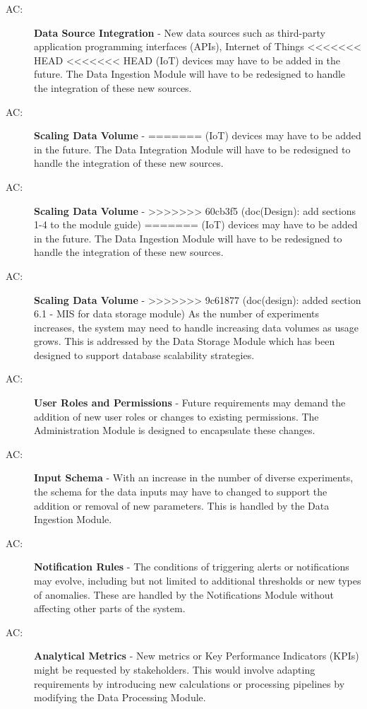 \documentclass[12pt, titlepage]{article}
\newcounter{acnum}
\newcommand{\actheacnum}{AC\theacnum}
\begin{document}
\begin{description}
  \item[ \actheacnum \label{acSource}:] \textbf{Data Source Integration} - 
  New data sources such as third-party application programming interfaces (APIs), Internet of Things
<<<<<<< HEAD
<<<<<<< HEAD
  (IoT) devices may have to be added in the future. The Data Ingestion Module will have to be 
  redesigned to handle the integration of these new sources.

  \item[ \actheacnum \label{acScaling}:] \textbf{Scaling Data Volume} - 
=======
  (IoT) devices may have to be added in the future. The Data Integration Module will have to be 
  redesigned to handle the integration of these new sources.

  \item[ \actheacnum \label{acStorage}:] \textbf{Scaling Data Volume} - 
>>>>>>> 60cb3f5 (doc(Design): add sections 1-4 to the module guide)
=======
  (IoT) devices may have to be added in the future. The Data Ingestion Module will have to be 
  redesigned to handle the integration of these new sources.

  \item[ \actheacnum \label{acScaling}:] \textbf{Scaling Data Volume} - 
>>>>>>> 9c61877 (doc(design): added section 6.1 - MIS for data storage module)
  As the number of experiments increases, the system may need to handle increasing data volumes
  as usage grows. This is addressed by the Data Storage Module which has been designed to support
  database scalability strategies.

  \item[ \actheacnum \label{acRoles}:] \textbf{User Roles and Permissions} - 
  Future requirements may demand the addition of new user roles or changes to existing permissions.
  The Administration Module is designed to encapsulate these changes.

  \item[ \actheacnum \label{acSchema}:] \textbf{Input Schema} - 
  With an increase in the number of diverse experiments, the schema for the data inputs may have to
  changed to support the addition or removal of new parameters. This is handled by the Data Ingestion
  Module.

  \item[ \actheacnum \label{acNotifs}:] \textbf{Notification Rules} - 
  The conditions of triggering alerts or notifications may evolve, including but not limited to
  additional thresholds or new types of anomalies. These are handled by the Notifications Module
  without affecting other parts of the system.
  
  \item[ \actheacnum \label{acMetrics}:] \textbf{Analytical Metrics} - 
  New metrics or Key Performance Indicators (KPIs) might be requested by stakeholders. This would
  involve adapting requirements by introducing new calculations or processing pipelines by modifying
  the Data Processing Module.
  
\end{description}
\end{document}
